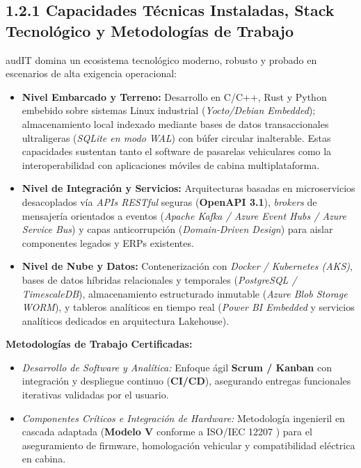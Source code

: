 \subsection{1.2.1 Capacidades Técnicas Instaladas, Stack Tecnológico y Metodologías de Trabajo}

audIT domina un ecosistema tecnológico moderno, robusto y probado en escenarios de alta exigencia operacional:

\begin{itemize}
    \item \textbf{Nivel Embarcado y Terreno:} Desarrollo en C/C++, Rust y Python embebido sobre sistemas Linux industrial (\emph{Yocto/Debian Embedded}); almacenamiento local indexado mediante bases de datos transaccionales ultraligeras (\emph{SQLite en modo WAL}) con búfer circular inalterable. Estas capacidades sustentan tanto el software de pasarelas vehiculares como la interoperabilidad con aplicaciones móviles de cabina multiplataforma.
    \item \textbf{Nivel de Integración y Servicios:} Arquitecturas basadas en microservicios desacoplados vía \emph{APIs RESTful} seguras (\textbf{OpenAPI 3.1}), \emph{brokers} de mensajería orientados a eventos (\emph{Apache Kafka / Azure Event Hubs / Azure Service Bus}) y capas anticorrupción (\emph{Domain-Driven Design}) para aislar componentes legados y ERPs existentes.
    \item \textbf{Nivel de Nube y Datos:} Contenerización con \emph{Docker / Kubernetes (AKS)}, bases de datos híbridas relacionales y temporales (\emph{PostgreSQL / TimescaleDB}), almacenamiento estructurado inmutable (\emph{Azure Blob Storage WORM}), y tableros analíticos en tiempo real (\emph{Power BI Embedded} y servicios analíticos dedicados en arquitectura Lakehouse).
\end{itemize}

\textbf{Metodologías de Trabajo Certificadas:}

\begin{itemize}
    \item \emph{Desarrollo de Software y Analítica:} Enfoque ágil \textbf{Scrum / Kanban} con integración y despliegue continuo (\textbf{CI/CD}), asegurando entregas funcionales iterativas validadas por el usuario.
    \item \emph{Componentes Críticos e Integración de Hardware:} Metodología ingenieril en cascada adaptada (\textbf{Modelo V} conforme a ISO/IEC 12207 \parencite{iso12207}) para el aseguramiento de firmware, homologación vehicular y compatibilidad eléctrica en cabina.
\end{itemize}

